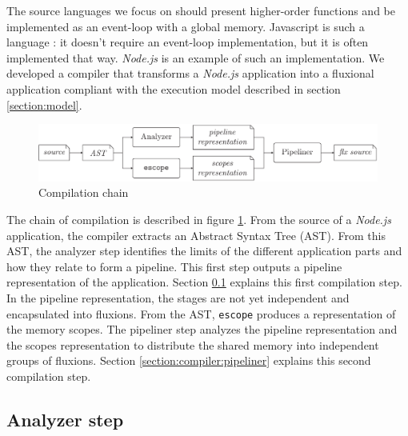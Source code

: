 The source languages we focus on should present higher-order functions and be implemented as an event-loop with a global memory.
Javascript is such a language : it doesn't require an event-loop implementation, but it is often implemented that way.
\textit{Node.js} is an example of such an implementation.
We developed a compiler that transforms a \textit{Node.js} application into a fluxional application compliant with the execution model described in section \ref{section:model}.

\begin{figure}[h!]
\begin{center}
  \includegraphics[width=\linewidth]{ressources/compiler-stream.pdf}
  \caption{Compilation chain}
  \label{fig:compilation}
\end{center}
\end{figure}

The chain of compilation is described in figure \ref{fig:compilation}.
From the source of a \textit{Node.js} application, the compiler extracts an Abstract Syntax Tree (AST).
From this AST, the analyzer step identifies the limits of the different application parts and how they relate to form a pipeline.
This first step outputs a pipeline representation of the application.
Section \ref{section:compiler:analyzer} explains this first compilation step.
In the pipeline representation, the stages are not yet independent and encapsulated into fluxions.
From the AST, \texttt{escope} produces a representation of the memory scopes.
The pipeliner step analyzes the pipeline representation and the scopes representation to distribute the shared memory into independent groups of fluxions.
Section \ref{section:compiler:pipeliner} explains this second compilation step.


\subsection{Analyzer step} \label{section:compiler:analyzer}

